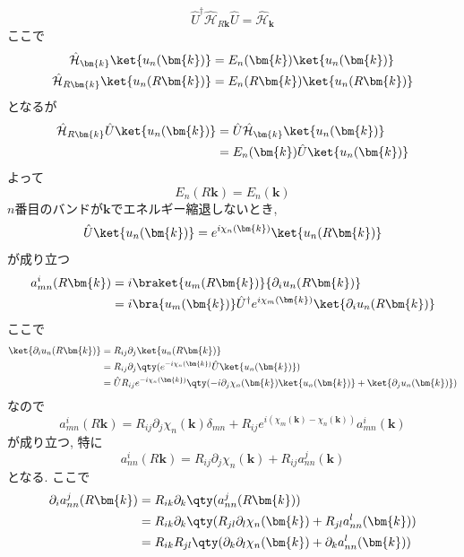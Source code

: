 \begin{equation*}
    \hat{U}^{\dagger} \hat{\mathcal{H}}_{R\bm{k}} \hat{U} = \hat{\mathcal{H}}_{\bm{k}}
\end{equation*}
ここで
\begin{align*}
    \hat{\mathcal{H}}_{\bm{k}} \ket{u_n(\bm{k})} & = E_n(\bm{k}) \ket{u_n(\bm{k})}\\
    \hat{\mathcal{H}}_{R\bm{k}} \ket{u_n(R\bm{k})} & = E_n(R\bm{k}) \ket{u_n(R\bm{k})}
\end{align*}
となるが
\begin{align*}
    \hat{\mathcal{H}}_{R\bm{k}} \hat{U} \ket{u_n(\bm{k})} & = \hat{U} \hat{\mathcal{H}}_{\bm{k}} \ket{u_n(\bm{k})}\\
    & = E_n(\bm{k}) \hat{U} \ket{u_n(\bm{k})}
\end{align*}
よって
\begin{equation*}
    E_n(R\bm{k}) = E_n(\bm{k})
\end{equation*}
$n$番目のバンドが$\bm{k}$でエネルギー縮退しないとき, 
\begin{equation*}
    \hat{U} \ket{u_n(\bm{k})} = e^{i\chi_n(\bm{k})} \ket{u_n(R \bm{k})} 
\end{equation*}
が成り立つ
\begin{align*}
    a^{i}_{mn}(R \bm{k}) & = i \braket{u_m(R\bm{k})}{\partial_i u_n(R\bm{k})}\\
    & = i \bra{u_m(\bm{k})} \hat{U}^{\dagger} e^{i\chi_m(\bm{k})} \ket{\partial_i u_n(R\bm{k})}
\end{align*}
ここで
\begin{align*}
    \ket{\partial_i u_n(R\bm{k})} & = R_{ij} \partial_j \ket{u_n(R\bm{k})}\\
    & = R_{ij} \partial_j \qty(e^{- i\chi_n(\bm{k})} \hat{U} \ket{u_n(\bm{k})})\\
    & = \hat{U} R_{ij} e^{- i\chi_n(\bm{k})} \qty( -i \partial_j \chi_n(\bm{k}) \ket{u_n(\bm{k})} + \ket{\partial_j u_n(\bm{k})})
\end{align*}
なので
\begin{equation*}
    a^{i}_{mn}(R \bm{k}) = R_{ij} \partial_j \chi_n(\bm{k}) \delta_{mn} + R_{ij} e^{i(\chi_m(\bm{k}) - \chi_n(\bm{k}))} a^i_{mn} (\bm{k})
\end{equation*}
が成り立つ, 特に
\begin{equation*}
    a^{i}_{nn}(R \bm{k}) = R_{ij} \partial_j \chi_n(\bm{k}) + R_{ij} a^j_{nn} (\bm{k})
\end{equation*}
となる. ここで
\begin{align*}
    \partial_i a^{j}_{nn}(R\bm{k}) & = R_{ik} \partial_k \qty(a^{j}_{nn}(R\bm{k}))\\
    & = R_{ik} \partial_k \qty( R_{jl} \partial_l \chi_n(\bm{k}) + R_{jl} a^l_{nn} (\bm{k}) )\\
    & = R_{ik} R_{jl} \qty( \partial_k \partial_l \chi_n(\bm{k}) + \partial_k a^l_{nn} (\bm{k}))
\end{align*}
